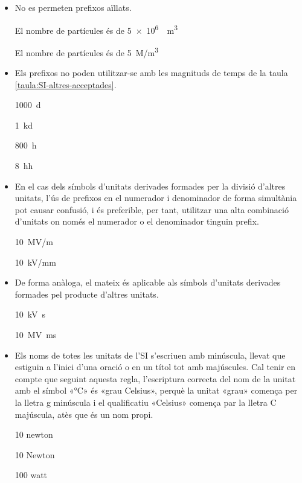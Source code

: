 \begin{itemize}
\item No es permeten prefixos aïllats.

\textcolor{Green}\faCheckSquare{} El nombre de partícules és de \qty[per-mode = symbol]{5e6}{\per\cubic\metre}

\textcolor{Red}\faTimesCircle{} El nombre de partícules és de \qty{5}{M/m^3}


\item Els prefixos no poden utilitzar-se amb les magnituds  de temps de la taula \vref{taula:SI-altres-acceptades}.

\textcolor{Green}\faCheckSquare{} \qty{1000}{d}

\textcolor{Red}\faTimesCircle{}  \qty{1}{kd}

\textcolor{Green}\faCheckSquare{} \qty{800}{h}

\textcolor{Red}\faTimesCircle{}  \qty{8}{hh}


\item En el cas dels símbols d'unitats derivades formades per la divisió
d'altres unitats, l'ús de prefixos en el numerador i denominador de
forma simultània pot causar confusió, i és preferible, per tant,
utilitzar una alta combinació d'unitats on només el numerador o el
denominador tinguin prefix.

\textcolor{Green}\faCheckSquare{} \qty{10}{MV/m}

\textcolor{Blue}\faExclamationTriangle{}  \qty{10}{kV/mm}


\item De forma anàloga, el mateix és aplicable als símbols d'unitats
derivades formades pel producte d'altres unitats.

\textcolor{Green}\faCheckSquare{} \qty{10}{kV.s}

\textcolor{Blue}\faExclamationTriangle{}  \qty{10}{MV.ms}


\item Els noms de totes les unitats de l'SI s'escriuen amb minúscula, llevat que estiguin a l'inici d'una oració o en un títol tot amb majúscules. Cal tenir en compte que seguint aquesta regla, l'escriptura  correcta
del nom de la unitat amb el símbol «\unit{\degreeCelsius}» és «grau Celsius», perquè la unitat  «grau» comença per la lletra g  minúscula i el qualificatiu «Celsius» comença par la lletra C  majúscula, atès que és un nom propi.


\textcolor{Green}\faCheckSquare{} 10 newton

\textcolor{Red}\faTimesCircle{} 10 Newton

\textcolor{Green}\faCheckSquare{}  100 watt


\end{itemize}
